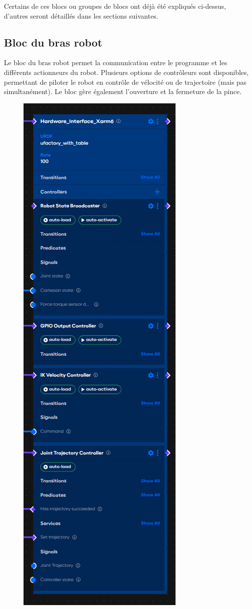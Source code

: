 Certains de ces blocs ou groupes de blocs ont déjà été expliqués ci-dessus, d'autres seront détaillés dans les sections suivantes.

\subsection{Bloc du bras robot}

Le bloc du bras robot permet la communication entre le programme et les différents actionneurs du robot. Plusieurs options de contrôleurs sont disponibles, permettant de piloter le robot en contrôle de vélocité ou de trajectoire (mais pas simultanément). Le bloc gère également l'ouverture et la fermeture de la pince.

\begin{figure}[H]
    \centering
    \includegraphics[height=0.8\textheight,keepaspectratio]{assets/figures/AICA_Hardware_interface.png}

\end{figure}

